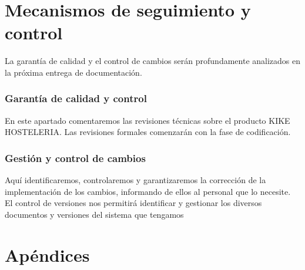 \documentclass[spanish,a4paper,12pt]{report}	%
\begin{document}
\newpage
\mbox{}
\thispagestyle{empty}						%
\newpage
\setcounter{section}{0}



\part{Mecanismos de seguimiento y control} La garantía de calidad y el control de cambios serán profundamente analizados en la próxima entrega de documentación.

	\section{Garantía de calidad y control} 
En este apartado comentaremos las revisiones técnicas sobre el producto KIKE HOSTELERIA. Las revisiones formales comenzarán con la fase de codificación.

	\section{Gestión y control de cambios}
Aquí identificaremos, controlaremos y garantizaremos la corrección de la implementación de los cambios, informando de ellos al personal que lo necesite.
El control de versiones nos permitirá identificar y gestionar los diversos documentos y versiones del sistema que tengamos


\newpage
\mbox{}
\thispagestyle{empty}						%
\newpage
\setcounter{section}{0}
\part{Apéndices}


\newpage
\mbox{}
\thispagestyle{empty}						%
\newpage
\end{document}
